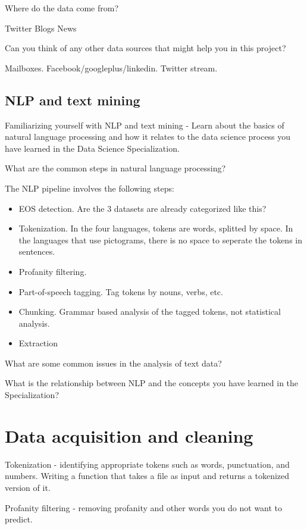 \documentclass{article}
\begin{document}
Where do the data come from?

Twitter
Blogs
News

Can you think of any other data sources that might help you in this project?

Mailboxes.
Facebook/googleplus/linkedin.
Twitter stream.


\subsection{NLP and text mining}


Familiarizing yourself with NLP and text mining - Learn about the basics of natural language processing and how it relates to the data science process you have learned in the Data Science Specialization.


What are the common steps in natural language processing?

The NLP pipeline involves the following steps:

\begin{itemize}
  \item EOS detection. Are the 3 datasets are already categorized like this?
  \item Tokenization. In the four languages, tokens are words, splitted by space. In the languages that use pictograms, there is no space to seperate the tokens in sentences.
  \item Profanity filtering. 
  \item Part-of-speech tagging. Tag tokens by nouns, verbs, etc.
  \item Chunking. Grammar based analysis of the tagged tokens, not statistical analysis.
  \item Extraction
\end{itemize}


What are some common issues in the analysis of text data?



What is the relationship between NLP and the concepts you have learned in the Specialization?


\section{Data acquisition and cleaning}

Tokenization - identifying appropriate tokens such as words, punctuation, and numbers. Writing a function that takes a file as input and returns a tokenized version of it.

Profanity filtering - removing profanity and other words you do not want to predict.
\end{document}
